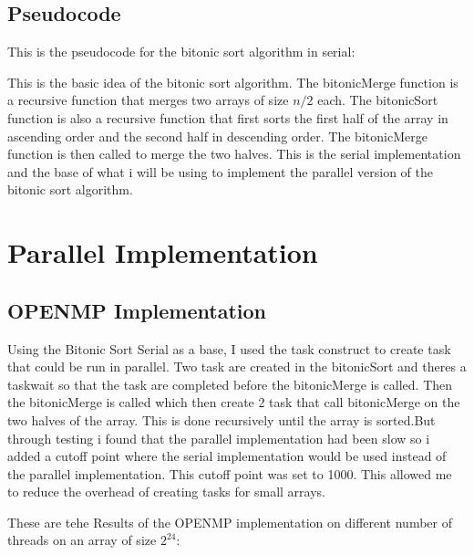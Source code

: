 \subsection*{Pseudocode}
This is the pseudocode for the bitonic sort algorithm in serial:\\
\begin{algorithm2e}
\end{algorithm2e}
This is the basic idea of the bitonic sort algorithm. The bitonicMerge function
is a recursive function that merges two arrays of size $n/2$ each. The
bitonicSort function is also a recursive function that first sorts the first
half of the array in ascending order and the second half in descending order.
The bitonicMerge function is then called to merge the two halves.
This is the serial implementation and the base of what i will be using to
implement the parallel version of the bitonic sort algorithm.

\section*{Parallel Implementation}

\subsection*{OPENMP Implementation}
Using the Bitonic Sort Serial as a base, I used the task construct to create
task that could be run in parallel. Two task are created in the bitonicSort and
theres a taskwait so that the task are completed before the bitonicMerge is
called. Then the bitonicMerge is called which then create 2 task that call
bitonicMerge on the two halves of the array. This is done recursively until the
array is sorted.But through testing i found that the parallel implementation
had been slow so i added a cutoff point where the serial implementation would
be used instead of the parallel implementation. This cutoff point was set to
1000. This allowed me to reduce the overhead of creating tasks for small
arrays.

These are tehe Results of the OPENMP implementation on different number of
threads on an array of size  $2^{24}$:

